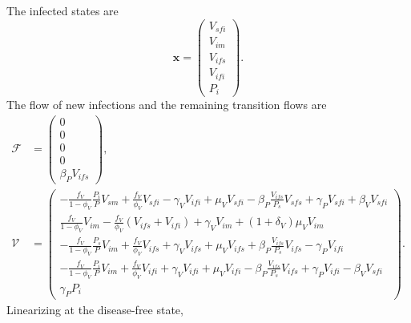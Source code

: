 \documentclass{article}
\renewcommand{\vec}[1]{\mathbf{#1}}
\begin{document}
The infected states are
\begin{equation}
  \vec{x} =
  \begin{pmatrix}
    V_{sfi}
    \\
    V_{im}
    \\
    V_{ifs}
    \\
    V_{ifi}
    \\
    P_i
  \end{pmatrix}.
\end{equation}
The flow of new infections and the remaining transition flows are
\begin{equation}
  \begin{split}
    \mathcal{F}
    &=
    \begin{pmatrix}
      0
      \\
      0
      \\
      0
      \\
      0
      \\
      \beta_P V_{ifs}
    \end{pmatrix},
    \\
    \mathcal{V}
    &=
    \begin{pmatrix}
      - \frac{f_V}{1 - \phi_V} \frac{P_i}{P} V_{sm}
      + \frac{f_V}{\phi_V} V_{sfi}
      - \gamma_V V_{ifi}
      + \mu_V V_{sfi}
      - \beta_P \frac{V_{ifs}}{P_s} V_{sfs}
      + \gamma_P V_{sfi}
      + \beta_V V_{sfi}
      \\
      \frac{f_V}{1 - \phi_V} V_{im}
      - \frac{f_V}{\phi_V} (V_{ifs} + V_{ifi})
      + \gamma_V V_{im}
      + (1 + \delta_V) \mu_V V_{im}
      \\
      - \frac{f_V}{1 - \phi_V} \frac{P_s}{P} V_{im}
      + \frac{f_V}{\phi_V} V_{ifs}
      + \gamma_V V_{ifs}
      + \mu_V V_{ifs}
      + \beta_P \frac{V_{ifs}}{P_s} V_{ifs}
      - \gamma_P V_{ifi}
      \\
      - \frac{f_V}{1 - \phi_V} \frac{P_i}{P} V_{im}
      + \frac{f_V}{\phi_V} V_{ifi}
      + \gamma_V V_{ifi}
      + \mu_V V_{ifi}
      - \beta_P \frac{V_{ifs}}{P_s} V_{ifs}
      + \gamma_P V_{ifi}
      - \beta_V V_{sfi}
      \\
      \gamma_P P_i
    \end{pmatrix}.
  \end{split}
\end{equation}
Linearizing at the disease-free state,
\end{document}
